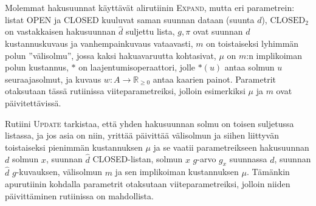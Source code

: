 \documentclass[finnish]{tktltiki2}
\theoremstyle{definition}
\theoremstyle{remark}
\begin{document}
Molemmat hakusuunnat käyttävät alirutiinin \textsc{Expand}, mutta eri parametrein: listat OPEN ja CLOSED kuuluvat saman suunnan dataan (suunta $d$), $\text{CLOSED}_2$ on vastakkaisen hakusuunnan $\hat{d}$ suljettu lista, $g, \pi$ ovat suunnan $d$ kustannuskuvaus ja vanhempainkuvaus vataavasti, $m$ on toistaiseksi lyhimmän polun ''välisolmu'', jossa kaksi hakuavaruutta kohtasivat, $\mu$ on $m$:n implikoiman polun kustannus, $\ast$ on laajentumisoperaattori, jolle $\ast(u)$ antaa solmun $u$ seuraajasolmut, ja kuvaus $w \colon A \to \mathbb{R}_{\geq 0}$ antaa kaarien painot. Parametrit otaksutaan tässä rutiinissa viiteparametreiksi, jolloin esimerkiksi $\mu$ ja $m$ ovat päivitettävissä. 

Rutiini \textsc{Update} tarkistaa, että yhden hakusuunnan solmu on toisen suljetussa listassa, ja jos asia on niin, yrittää päivittää välisolmun ja siihen liittyvän toistaiseksi pienimmän kustannuksen $\mu$ ja se vaatii parametreikseen hakusuunnan $d$ solmun $x$, suunnan $\hat{d}$ CLOSED-listan, solmun $x$ $g$-arvo $g_x$ suunnassa $d$, suunnan $\hat{d}$ $g$-kuvauksen, välisolmun $m$ ja sen implikoiman kustannuksen $\mu$. Tämänkin apurutiinin kohdalla parametrit otaksutaan viiteparametreiksi, jolloin niiden päivittäminen rutiinissa on mahdollista.
\end{document}
